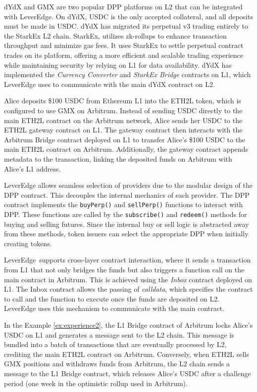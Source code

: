 dYdX and GMX are two popular DPP platforms on L2 that can be integrated with LeverEdge. On dYdX, USDC is the only accepted collateral, and all deposits must be made in USDC. dYdX has migrated its perpetual v3 trading entirely to the StarkEx L2 chain. StarkEx, utilizes zk-rollups to enhance transaction throughput and minimize gas fees. It uses StarkEx to settle perpetual contract trades on its platform, offering a more efficient and scalable trading experience while maintaining security by relying on L1 for data availability. dYdX has implemented the \textit{Currency Converter} and \textit{StarkEx Bridge} contracts on L1, which LeverEdge uses to communicate with the main dYdX contract on L2.

\begin{example}\label{ex:experience2}
	Alice deposits \$100 USDC from Ethereum L1 into the ETH2L token, which is configured to use GMX on Arbitrum. Instead of sending USDC directly to the main ETH2L contract on the Arbitrum network, Alice sends her USDC to the ETH2L gateway contract on L1. The gateway contract then interacts with the Arbitrum Bridge contract deployed on L1 to transfer Alice's \$100 USDC to the main ETH2L contract on Arbitrum. Additionally, the gateway contract appends metadata to the transaction, linking the deposited funds on Arbitrum with Alice's L1 address.
\end{example}

LeverEdge allows seamless selection of providers due to the modular design of the DPP contract. This decouples the internal mechanics of each provider. The DPP contract implements the \texttt{buyPerp()} and \texttt{sellPerp()} functions to interact with DPP. These functions are called by the \texttt{subscribe()} and \texttt{redeem()} methods for buying and selling futures. Since the internal buy or sell logic is abstracted away from these methods, token issuers can select the appropriate DPP when initially creating tokens.

LeverEdge\ supports cross-layer contract interaction, where it sends a transaction from L1 that not only bridges the funds but also triggers a function call on the main contract in Arbitrum. This is achieved using the \textit{Inbox} contract deployed on L1. The Inbox contract allows the passing of \textit{calldata}, which specifies the contract to call and the function to execute once the funds are deposited on L2. LeverEdge uses this mechanism to communicate with the main contract.

\begin{example}
	In the Example \ref{ex:experience2}, the L1 Bridge contract of Arbitrum locks Alice's USDC on L1 and generates a message sent to the L2 chain. This message is bundled into a batch of transactions that are eventually processed by L2, crediting the main ETH2L contract on Arbitrum. Conversely, when ETH2L sells GMX positions and withdraws funds from Arbitrum, the L2 chain sends a message to the L1 Bridge contract, which releases Alice's USDC after a challenge period (\ie one week in the optimistic rollup used in Arbitrum).
\end{example}

